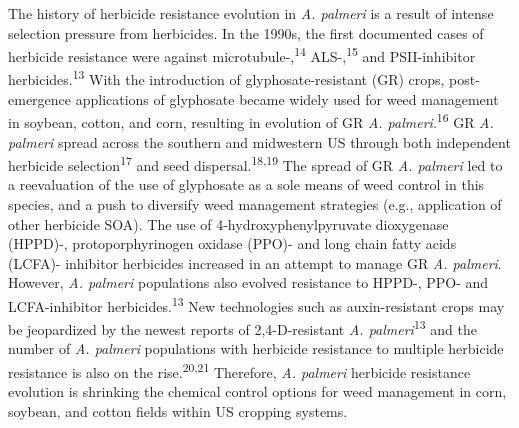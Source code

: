 \documentclass[
  12pt,
  a4paper]{article}
\begin{document}
The history of herbicide resistance evolution in \emph{A. palmeri} is a
result of intense selection pressure from herbicides. In the 1990s, the
first documented cases of herbicide resistance were against
microtubule-,\textsuperscript{14} ALS-,\textsuperscript{15} and
PSII-inhibitor herbicides.\textsuperscript{13} With the introduction of
glyphosate-resistant (GR) crops, post-emergence applications of
glyphosate became widely used for weed management in soybean, cotton,
and corn, resulting in evolution of GR \emph{A.
palmeri}.\textsuperscript{16} GR \emph{A. palmeri} spread across the
southern and midwestern US through both independent herbicide
selection\textsuperscript{17} and seed dispersal.\textsuperscript{18,19}
The spread of GR \emph{A. palmeri} led to a reevaluation of the use of
glyphosate as a sole means of weed control in this species, and a push
to diversify weed management strategies (e.g., application of other
herbicide SOA). The use of 4-hydroxyphenylpyruvate dioxygenase (HPPD)-,
protoporphyrinogen oxidase (PPO)- and long chain fatty acids (LCFA)-
inhibitor herbicides increased in an attempt to manage GR \emph{A.
palmeri}. However, \emph{A. palmeri} populations also evolved resistance
to HPPD-, PPO- and LCFA-inhibitor herbicides.\textsuperscript{13} New
technologies such as auxin-resistant crops may be jeopardized by the
newest reports of 2,4-D-resistant \emph{A. palmeri}\textsuperscript{13}
and the number of \emph{A. palmeri} populations with herbicide
resistance to multiple herbicide resistance is also on the
rise.\textsuperscript{20,21} Therefore, \emph{A. palmeri} herbicide
resistance evolution is shrinking the chemical control options for weed
management in corn, soybean, and cotton fields within US cropping
systems.
\end{document}
